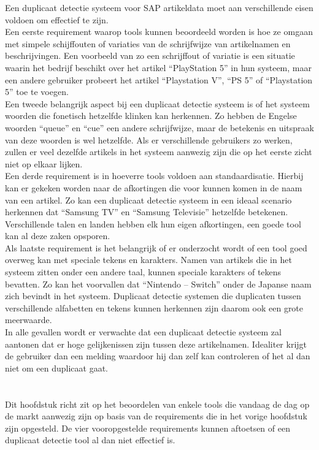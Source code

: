 Een duplicaat detectie systeem voor SAP artikeldata moet aan verschillende eisen voldoen om effectief te zijn.
\\Een eerste requirement waarop tools kunnen beoordeeld worden is hoe ze omgaan met simpele schijffouten of variaties van de schrijfwijze van artikelnamen en beschrijvingen. Een voorbeeld van zo een schrijffout of variatie is een situatie waarin het bedrijf beschikt over het artikel “PlayStation 5” in hun systeem, maar een andere gebruiker probeert het artikel “Playstation V”, “PS 5” of “Playstation 5”  toe te voegen.
\\Een tweede belangrijk aspect bij een duplicaat detectie systeem is of het systeem woorden die fonetisch hetzelfde klinken kan herkennen. Zo hebben de Engelse woorden “queue” en “cue” een andere schrijfwijze, maar de betekenis en uitspraak van deze woorden is wel hetzelfde. Als er verschillende gebruikers zo werken, zullen er veel dezelfde artikels in het systeem aanwezig zijn die op het eerste zicht niet op elkaar lijken.
\\Een derde requirement is in hoeverre tools voldoen aan standaardisatie. Hierbij kan er gekeken worden naar de afkortingen die voor kunnen komen in de naam van een artikel. Zo kan een duplicaat detectie systeem in een ideaal scenario herkennen dat “Samsung TV” en “Samsung Televisie” hetzelfde betekenen. Verschillende talen en landen hebben elk hun eigen afkortingen, een goede tool kan al deze zaken opsporen.
\\Als laatste requirement is het belangrijk of er onderzocht wordt of een tool goed overweg kan met speciale tekens en karakters. Namen van artikels die in het systeem zitten onder een andere taal, kunnen speciale karakters of tekens bevatten. Zo kan het voorvallen dat “Nintendo – Switch” onder de Japanse naam zich bevindt in het systeem. Duplicaat detectie systemen die duplicaten tussen verschillende alfabetten en tekens kunnen herkennen zijn daarom ook een grote meerwaarde. 
\\In alle gevallen wordt er verwachte dat een duplicaat detectie systeem zal aantonen dat er hoge gelijkenissen zijn tussen deze artikelnamen. Idealiter krijgt de gebruiker dan een melding waardoor hij dan zelf kan controleren of het al dan niet om een duplicaat gaat.

\section{}%
\label{sec:tools}
Dit hoofdstuk richt zit op het beoordelen van enkele tools die vandaag de dag op de markt aanwezig zijn op basis van de requirements die in het vorige hoofdstuk zijn opgesteld. De vier vooropgestelde requirements kunnen aftoetsen of een duplicaat detectie tool al dan niet effectief is.


